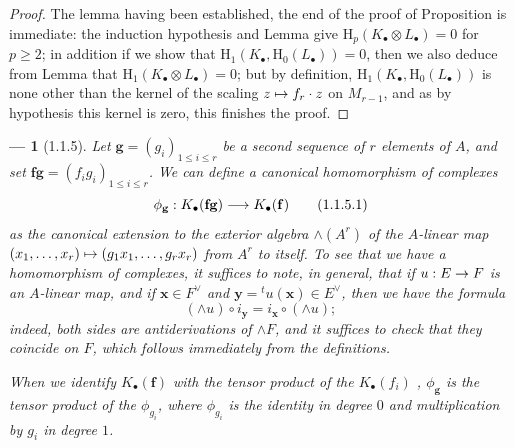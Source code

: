 \documentclass[oneside]{amsart}
\theoremstyle{ega-env-style}
\newtheorem*{env}{---}
\theoremstyle{ega-thm-env-style}
\theoremstyle{ega-defn-env-style}
\def\leq{\leqslant}                 %
\def\geq{\geqslant}                 %
\def\vphi{\phi}                     %
\def\HH{\mathrm{H}}                 %
\def\dual#1{{#1}^\vee}              %
\renewcommand{\to}{\mathchoice{\longrightarrow}{\rightarrow}{\rightarrow}{\rightarrow}}
\let\mapstoo\mapsto
\renewcommand{\mapsto}{\mathchoice{\longmapsto}{\mapstoo}{\mapstoo}{\mapstoo}}
\let\EGAOriginalLabel\label
\renewcommand{\label}[1]{\phantomsection\EGAOriginalLabel{#1}}
\begin{document}
\begin{proof}
The lemma having been established, the end of the proof of Proposition  is immediate: the induction hypothesis and Lemma  give $\HH_p(K_\bullet\otimes L_\bullet)=0$ for $p\geq 2$; in addition if we show that $\HH_1(K_\bullet,\HH_0(L_\bullet))=0$, then we also deduce from Lemma  that $\HH_1(K_\bullet\otimes L_\bullet)=0$; but by definition, $\HH_1(K_\bullet,\HH_0(L_\bullet))$ is none other than the kernel of the scaling $z\mapsto f_r\cdot z$ on $M_{r-1}$, and as by hypothesis this kernel is zero, this finishes the proof.
\end{proof}

\begin{env}[1.1.5]
\label{III.1.1.5}
Let $\mathbf{g}=(g_i)_{1\leq i\leq r}$ be a second sequence of $r$ elements of $A$, and set $\mathbf{f}\mathbf{g}=(f_i g_i)_{1\leq i\leq r}$.
We can define a canonical homomorphism of complexes
\[
  \vphi_\mathbf{g}:K_\bullet(\mathbf{f}\mathbf{g})\to K_\bullet(\mathbf{f})
  \tag{1.1.5.1}
\]
as the canonical extension to the exterior algebra $\wedge(A^r)$ of the $A$-linear map $(x_1,\dots,x_r)\mapsto(g_1 x_1,\dots,g_r x_r)$ from $A^r$ to itself.
To see that we have a homomorphism of complexes, it suffices to note, in general, that if $u:E\to F$ is an $A$-linear map, and if $\mathbf{x}\in\dual{F}$ and $\mathbf{y}={}^t u(\mathbf{x})\in\dual{E}$, then we have the formula
\[
  (\wedge u)\circ i_\mathbf{y}=i_\mathbf{x}\circ(\wedge u);
  \tag{1.1.5.2}
\]
indeed, both sides are antiderivations of $\wedge F$, and it suffices to check that they coincide on $F$, which follows immediately from the definitions.

When we identify $K_\bullet(\mathbf{f})$ with the tensor product of the $K_\bullet(f_i)$ , $\vphi_\mathbf{g}$ is the tensor product of the $\vphi_{g_i}$, where $\vphi_{g_i}$ is the identity in degree $0$ and multiplication by $g_i$ in degree $1$.
\end{env}
\end{document}
